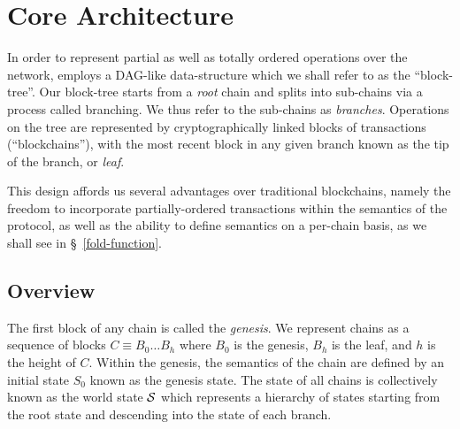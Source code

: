 \section{Core Architecture}


In order to represent partial as well as totally ordered operations over the
network, \oscoin{} employs a DAG-like data-structure which we shall refer to as
the ``block-tree''.  Our block-tree starts from a \emph{root} chain and splits
into sub-chains via a process called branching. We thus refer to the sub-chains as
\emph{branches}.  Operations on the tree are represented by cryptographically
linked blocks of transactions (``blockchains''), with the most recent block in
any given branch known as the tip of the branch, or \emph{leaf}.

This design affords us several advantages over traditional blockchains, namely
the freedom to incorporate partially-ordered transactions within the semantics
of the protocol, as well as the ability to define semantics on a per-chain
basis, as we shall see in \S~\ref{fold-function}.




\subsection{Overview}

The first block of any chain is called the \emph{genesis}. We represent chains
as a sequence of blocks $C \equiv B_0 \dots B_h$ where $B_0$ is the genesis,
$B_h$ is the leaf, and $h$ is the height of $C$. Within the genesis, the
semantics of the chain are defined by an initial state $S_0$ known as the
genesis state. The state of all chains is collectively known as the world state
$\mathcal{S}$ which represents a hierarchy of states starting from the root state
and descending into the state of each branch.

